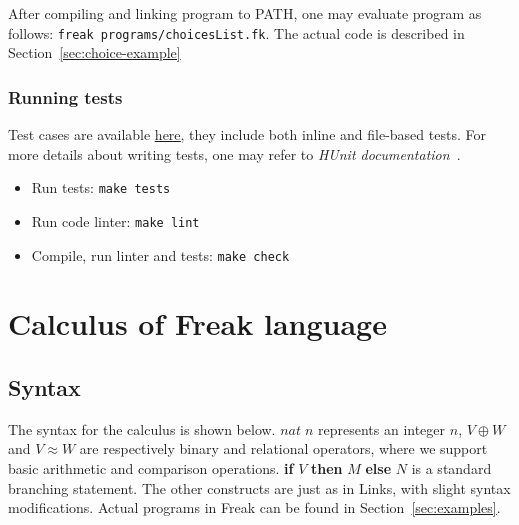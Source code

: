 \documentclass[declaration,shortabstract]{iithesis}
\theoremstyle{definition} \newtheorem{definition}{Definition}[chapter]
\theoremstyle{remark} \newtheorem{remark}[definition]{Observation}
\theoremstyle{plain} \newtheorem{theorem}[definition]{Theorem}
\theoremstyle{plain} \newtheorem{lemma}[definition]{Lemma}
\begin{document}
    After compiling and linking program to PATH, one may evaluate program as
    follows: \verb!freak programs/choicesList.fk!. The actual code is described in Section~\ref{sec:choice-example}

    \subsection{Running tests}

    Test cases are available \href{https://github.com/Tomatosoup97/freak/blob/master/src/Tests.hs}{\underline{here}},
    they include both inline and file-based tests. For more details about
    writing tests, one may refer to \textit{HUnit documentation}~\cite{hunit-docs}.

    \begin{itemize}
        \item Run tests: \verb!make tests!
        \item Run code linter: \verb!make lint!
        \item Compile, run linter and tests: \verb!make check!
    \end{itemize}

\chapter{Calculus of Freak language}
\section{Syntax}

    The syntax for the calculus is shown below. $nat \; n$ represents an integer $n$,
    $V \oplus W$ and $V \approx W$ are respectively binary and relational operators,
    where we support basic arithmetic and comparison operations.
    \textbf{if} $V$ \textbf{then} $M$ \textbf{else} $N$ is a standard branching
    statement. The other constructs are just as in Links, with slight syntax
    modifications. Actual programs in Freak can be found in Section~\ref{sec:examples}.
\end{document}
